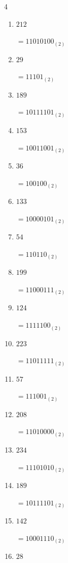 \begin{multicols}{4}
\begin{enumerate}
        $=1010110_{(2)}$

  \item $212$

        $=11010100_{(2)}$

  \item $29$

        $=11101_{(2)}$

  \item $189$

        $=10111101_{(2)}$

  \item $153$

        $=10011001_{(2)}$

  \item $36$

        $=100100_{(2)}$

  \item $133$

        $=10000101_{(2)}$

  \item $54$

        $=110110_{(2)}$

  \item $199$

        $=11000111_{(2)}$

  \item $124$

        $=1111100_{(2)}$

\columnbreak %

\resetques

  \item $223$

        $=11011111_{(2)}$

  \item $57$

        $=111001_{(2)}$

  \item $208$

        $=11010000_{(2)}$

  \item $234$

        $=11101010_{(2)}$

  \item $189$

        $=10111101_{(2)}$

  \item $142$

        $=10001110_{(2)}$

  \item $28$


\end{enumerate}
\end{multicols}
